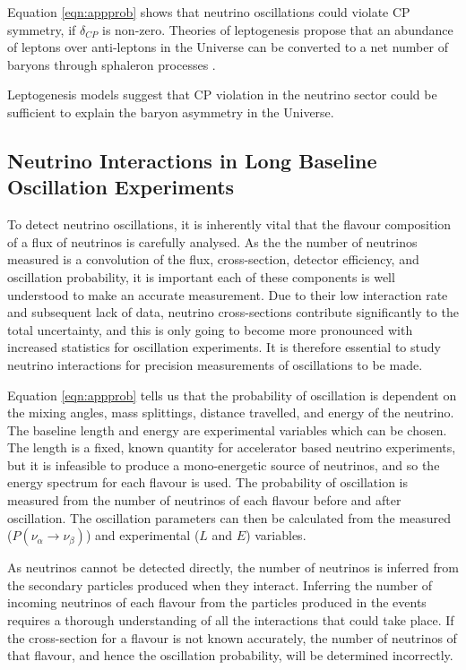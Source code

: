 Equation \ref{eqn:appprob} shows that neutrino oscillations could violate CP symmetry, if $\delta_{CP}$ is non-zero. Theories of leptogenesis propose that an abundance of leptons over anti-leptons in the Universe can be converted to a net number of baryons through sphaleron processes \cite{sphaleron}. 

Leptogenesis models \cite{lepto1}\cite{lepto2} suggest that CP violation in the neutrino sector could be sufficient to explain the baryon asymmetry in the Universe.

\subsection{Neutrino Interactions in Long Baseline Oscillation Experiments}\label{sec:interactions}

To detect neutrino oscillations, it is inherently vital that the flavour composition of a flux of neutrinos is carefully analysed. As the the number of neutrinos measured is a convolution of the flux, cross-section, detector efficiency, and oscillation probability, it is important each of these components is well understood to make an accurate measurement. Due to their low interaction rate and subsequent lack of data, neutrino cross-sections contribute significantly to the total uncertainty, and this is only going to become more pronounced with increased statistics for oscillation experiments. It is therefore essential to study neutrino interactions for precision measurements of oscillations to be made.

Equation \eqref{eqn:appprob} tells us that the probability of oscillation is dependent on the mixing angles, mass splittings, distance travelled, and energy of the neutrino. The baseline length and energy are experimental variables which can be chosen. The length is a fixed, known quantity for accelerator based neutrino experiments, but it is infeasible to produce a mono-energetic source of neutrinos, and so the energy spectrum for each flavour is used. The probability of oscillation is measured from the number of neutrinos of each flavour before and after oscillation. The oscillation parameters can then be calculated from the measured ($P(\nu_{\alpha}\rightarrow \nu_{\beta})$) and experimental ($L$ and $E$) variables.

As neutrinos cannot be detected directly, the number of neutrinos is inferred from the secondary particles produced when they interact. Inferring the number of incoming neutrinos of each flavour from the particles produced in the events requires a thorough understanding of all the interactions that could take place. If the cross-section for a flavour is not known accurately, the number of neutrinos of that flavour, and hence the oscillation probability, will be determined incorrectly.

